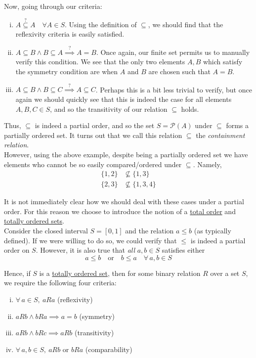 \documentclass[12pt]{article}
\newlength\tindent
\renewcommand{\indent}{\hspace*{\tindent}}
\begin{document}
Now, going through our criteria:
\begin{enumerate}[(i)]
	\item $A \stackrel{?}{\subseteq} A \quad \forall A \in S$. Using the definition of $\subseteq$, we should find that the reflexivity criteria is easily satisfied. 
	\item $A \subseteq B \land B \subseteq A \stackrel{?}{\implies} A = B$. Once again, our finite set permits us to manually verify this condition. We see that the only two elements $A, B$ which satisfy the symmetry condition are when $A$ and $B$ are chosen such that $A = B$.
	\item $A \subseteq B \land B \subseteq C \stackrel{?}{\implies} A \subseteq C$. Perhaps this is a bit less trivial to verify, but once again we should quickly see that this is indeed the case for all elements $A, B, C \in S$, and so the transitivity of our relation $\subseteq$ holds.
\end{enumerate}

\indent 	Thus, $\subseteq$ is indeed a partial order, and so the set $S = \mathcal P(A)$ under $\subseteq$ forms a partially ordered set. It turns out that we call this relation $\subseteq$ the {\em containment relation}. \\

\indent However, using the above example, despite being a partially ordered set we have elements who cannot be so easily compared/ordered under $\subseteq$. Namely,
\begin{align*}
	\{1, 2\} &\nsubseteq \{1, 3\} \\
	\{2, 3\} &\nsubseteq \{1, 3, 4\}
\end{align*}

\indent It is not immediately clear how we should deal with these cases under a partial order. For this reason we choose to introduce the notion of a \underline{total order} and \underline{totally ordered sets}. \\

\indent Consider the closed interval $S = [0, 1]$ and the relation $a \leq b$ (as typically defined). If we were willing to do so, we could verify that $\leq$ is indeed a partial order on $S$. However, it is also true that {\em all} $a, b \in S$ satisfies either
\begin{equation*}
	a \leq b \quad \text{or} \quad b \leq a \quad \forall\,a,b\in S
\end{equation*}

\indent Hence, if $S$ is a \underline{totally ordered set}, then for some binary relation $R$ over a set $S$, we require the following four criteria:
\begin{enumerate}[(i)]
	\item $\forall\,a\in S, ~ aRa$ (reflexivity)
	\item $aRb \land bRa \implies a = b$ (symmetry)
	\item $aRb \land bRc \implies aRb$ (transitivity)
	\item $ \forall\,a,b\in S, ~ aRb \text{ or } bRa$ (comparability)
\end{enumerate}
\end{document}
